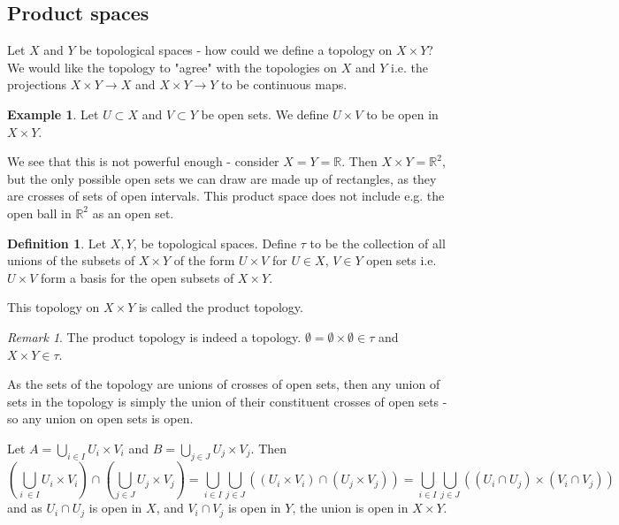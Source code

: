 \documentclass{article}
\theoremstyle{definition}
\newtheorem{defn}{Definition}[section]
\newtheorem{exmp}{Example}[section]
\theoremstyle{plain}%
\theoremstyle{remark}
\newtheorem*{rem}{Remark}
\newcommand{\Union}{\bigcup}
\newcommand{\intersection}{\cap}
\newcommand{\cross}{\times}
\newcommand{\R}{\mathbb{R}}
\begin{document}
\subsection{Product spaces}

Let $X$ and $Y$ be topological spaces - how could we define a topology on $X \cross Y$? We would like the topology to "agree" with the topologies on $X$ and $Y$ i.e. the projections $X \cross Y \to X$ and $X \cross Y \to Y$ to be continuous maps.

\begin{exmp}
    Let $U \subset X$ and $V \subset Y$ be open sets. We define $U \cross V$ to be open in $X \cross Y$.

    We see that this is not powerful enough - consider $X = Y = \R$. Then $X \cross Y = \R^2$, but the only possible open sets we can draw are made up of rectangles, as they are crosses of sets of open intervals. This product space does not include e.g. the open ball in $\R^2$ as an open set.
\end{exmp}

\begin{defn}
    Let $X, Y$, be topological spaces. Define $\tau$ to be the collection of all unions of the subsets of $X \cross Y$ of the form $U \cross V$ for $U \in X$, $V \in Y$ open sets i.e. $U \times V$ form a basis for the open subsets of $X \times Y$.

    This topology on $X \cross Y$ is called the product topology.
\end{defn}

\begin{rem}
    The product topology is indeed a topology. $\emptyset = \emptyset \cross \emptyset \in \tau$ and $X \cross Y \in \tau$.

    As the sets of the topology are unions of crosses of open sets, then any union of sets in the topology is simply the union of their constituent crosses of open sets - so any union on open sets is open.

    Let $A = \Union_{i \in I} U_i \cross V_i$ and $B = \Union_{j \in J} U_j \cross V_j$. Then
    \[\left(\Union_{i\ \in I} U_i \cross V_i\right) \intersection \left( \Union_{j \in J} U_j \cross V_j \right) = \Union_{i \in I} \Union_{j \in J} \left( (U_i \cross V_i) \intersection (U_j \cross V_j) \right) = \Union_{i \in I}\Union_{j \in J} \left( (U_i \intersection U_j) \cross (V_i \intersection V_j) \right) \]
    and as $U_i \intersection U_j$ is open in $X$, and $V_i \intersection V_j$ is open in $Y$, the union is open in $X \cross Y$.
\end{rem}
\end{document}
